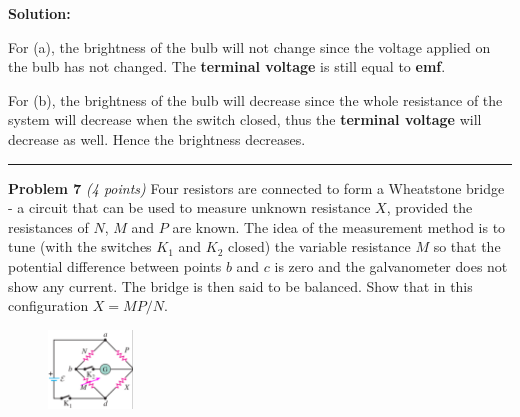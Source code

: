 \documentclass[a4paper, 11pt]{article}
\newenvironment{problem}[3][Problem]
    { \begin{mdframed}[backgroundcolor=gray!20] \textbf{#1 #2} \textit{(#3 points)} }
    {  \end{mdframed}}
\newenvironment{solution}
    {\textbf{Solution:}}
    {}
\begin{document}
\begin{solution}
	\par For (a), the brightness of the bulb will not change since the voltage applied
	on the bulb has not changed. The \textbf{terminal voltage} is still equal to \textbf{emf}.
	\par For (b), the brightness of the bulb will decrease since the whole resistance of the
	system will decrease when the switch closed, thus the \textbf{terminal voltage} will decrease
	as well. Hence the brightness decreases.
\end{solution}

\noindent\rule{7.1in}{2.8pt}

\begin{problem}{7}{4}
Four resistors are connected to form a Wheatstone bridge - a circuit that
can be used to measure unknown resistance $X$, provided the resistances of
$N$, $M$ and $P$ are known. The idea of the measurement method is to tune
(with the switches $K_1$ and $K_2$ closed) the variable resistance $M$ so that the
potential difference between points $b$ and $c$ is zero and the galvanometer
does not show any current. The bridge is then said to be balanced. Show
that in this configuration $X = MP/N$.
\end{problem}
\begin{figure}[!htbp]
	\begin{small}
		\begin{center}
			\includegraphics[width=0.2\textwidth]{hw5_p7_question.png}
		\end{center}
	\end{small}
\end{figure}
\end{document}

